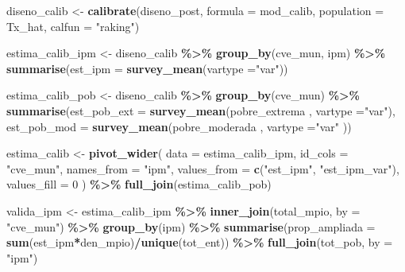\documentclass[
  12pt,
]{book}
\newenvironment{Shaded}{\begin{snugshade}}{\end{snugshade}}
\newcommand{\AttributeTok}[1]{\textcolor[rgb]{0.13,0.29,0.53}{#1}}
\newcommand{\DecValTok}[1]{\textcolor[rgb]{0.00,0.00,0.81}{#1}}
\newcommand{\FunctionTok}[1]{\textcolor[rgb]{0.13,0.29,0.53}{\textbf{#1}}}
\newcommand{\NormalTok}[1]{#1}
\newcommand{\OtherTok}[1]{\textcolor[rgb]{0.56,0.35,0.01}{#1}}
\newcommand{\SpecialCharTok}[1]{\textcolor[rgb]{0.81,0.36,0.00}{\textbf{#1}}}
\newcommand{\StringTok}[1]{\textcolor[rgb]{0.31,0.60,0.02}{#1}}
\begin{document}
\begin{Shaded}
\begin{Highlighting}[]
\NormalTok{    diseno\_calib }\OtherTok{\textless{}{-}} \FunctionTok{calibrate}\NormalTok{(diseno\_post, }\AttributeTok{formula =}\NormalTok{ mod\_calib, }
                              \AttributeTok{population =}\NormalTok{ Tx\_hat, }\AttributeTok{calfun =} \StringTok{"raking"}\NormalTok{)}

\NormalTok{    estima\_calib\_ipm  }\OtherTok{\textless{}{-}}\NormalTok{ diseno\_calib }\SpecialCharTok{\%\textgreater{}\%} \FunctionTok{group\_by}\NormalTok{(cve\_mun, ipm) }\SpecialCharTok{\%\textgreater{}\%} 
      \FunctionTok{summarise}\NormalTok{(}\AttributeTok{est\_ipm =} \FunctionTok{survey\_mean}\NormalTok{(}\AttributeTok{vartype =}\StringTok{"var"}\NormalTok{))}

\NormalTok{    estima\_calib\_pob  }\OtherTok{\textless{}{-}}\NormalTok{ diseno\_calib }\SpecialCharTok{\%\textgreater{}\%} \FunctionTok{group\_by}\NormalTok{(cve\_mun) }\SpecialCharTok{\%\textgreater{}\%} 
      \FunctionTok{summarise}\NormalTok{(}\AttributeTok{est\_pob\_ext =} \FunctionTok{survey\_mean}\NormalTok{(pobre\_extrema , }\AttributeTok{vartype =}\StringTok{"var"}\NormalTok{),}
                \AttributeTok{est\_pob\_mod =} \FunctionTok{survey\_mean}\NormalTok{(pobre\_moderada  , }\AttributeTok{vartype =}\StringTok{"var"}\NormalTok{ ))}

\NormalTok{    estima\_calib }\OtherTok{\textless{}{-}} \FunctionTok{pivot\_wider}\NormalTok{(}
      \AttributeTok{data =}\NormalTok{ estima\_calib\_ipm,}
      \AttributeTok{id\_cols =} \StringTok{"cve\_mun"}\NormalTok{,}
      \AttributeTok{names\_from =} \StringTok{"ipm"}\NormalTok{,}
      \AttributeTok{values\_from =} \FunctionTok{c}\NormalTok{(}\StringTok{"est\_ipm"}\NormalTok{, }\StringTok{"est\_ipm\_var"}\NormalTok{), }\AttributeTok{values\_fill =} \DecValTok{0}
\NormalTok{    ) }\SpecialCharTok{\%\textgreater{}\%} \FunctionTok{full\_join}\NormalTok{(estima\_calib\_pob)}

\NormalTok{    valida\_ipm }\OtherTok{\textless{}{-}}\NormalTok{ estima\_calib\_ipm }\SpecialCharTok{\%\textgreater{}\%} \FunctionTok{inner\_join}\NormalTok{(total\_mpio, }\AttributeTok{by =} \StringTok{"cve\_mun"}\NormalTok{) }\SpecialCharTok{\%\textgreater{}\%} 
      \FunctionTok{group\_by}\NormalTok{(ipm) }\SpecialCharTok{\%\textgreater{}\%} 
      \FunctionTok{summarise}\NormalTok{(}\AttributeTok{prop\_ampliada =} \FunctionTok{sum}\NormalTok{(est\_ipm}\SpecialCharTok{*}\NormalTok{den\_mpio)}\SpecialCharTok{/}\FunctionTok{unique}\NormalTok{(tot\_ent)) }\SpecialCharTok{\%\textgreater{}\%} 
      \FunctionTok{full\_join}\NormalTok{(tot\_pob, }\AttributeTok{by =} \StringTok{"ipm"}\NormalTok{)}


\end{Highlighting}
\end{Shaded}
\end{document}
